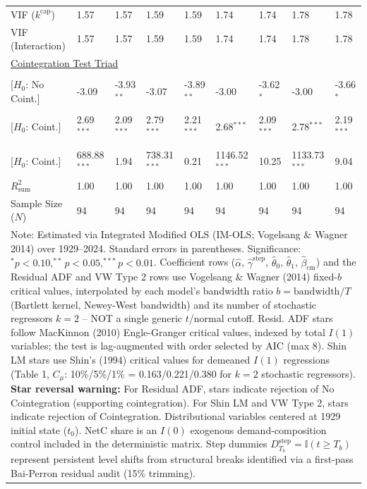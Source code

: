 \begin{table}[H]
\begin{tabular}{p{3.8cm}p{1.35cm}p{1.35cm}p{1.35cm}p{1.35cm}p{1.35cm}p{1.35cm}p{1.35cm}p{1.35cm}}
VIF ($k^{\text{cap}}$) & 1.57 & 1.57 & 1.59 & 1.59 & 1.74 & 1.74 & 1.78 & 1.78  \\
VIF (Interaction) & 1.57 & 1.57 & 1.59 & 1.59 & 1.74 & 1.74 & 1.78 & 1.78  \\
\midrule
\multicolumn{9}{l}{\underline{Cointegration Test Triad}} \\
\makecell[l]{Resid. ADF ($t_{\text{ADF}}$) \\ {\scriptsize [$H_0$: No Coint.]}} & -3.09 & -3.93$^{**}$ & -3.07 & -3.89$^{**}$ & -3.00 & -3.62$^{*}$ & -3.00 & -3.66$^{*}$  \\
\makecell[l]{Shin LM ($C_{\text{Shin}}$) \\ {\scriptsize [$H_0$: Coint.]}} & 2.69$^{***}$ & 2.09$^{***}$ & 2.79$^{***}$ & 2.21$^{***}$ & 2.68$^{***}$ & 2.09$^{***}$ & 2.78$^{***}$ & 2.19$^{***}$  \\
\makecell[l]{VW Type 2 ($S_{\text{Type 2}}$) \\ {\scriptsize [$H_0$: Coint.]}} & 688.88$^{***}$ & 1.94 & 738.31$^{***}$ & 0.21 & 1146.52$^{***}$ & 10.25 & 1133.73$^{***}$ & 9.04  \\
\midrule
$R^2_{\text{sum}}$ & 1.00 & 1.00 & 1.00 & 1.00 & 1.00 & 1.00 & 1.00 & 1.00  \\
Sample Size ($N$) & 94 & 94 & 94 & 94 & 94 & 94 & 94 & 94  \\
\bottomrule
\multicolumn{9}{p{13.2cm}}{\footnotesize Note: Estimated via Integrated Modified OLS (IM-OLS; Vogelsang \& Wagner 2014) over 1929--2024. Standard errors in parentheses. Significance: $^*p<0.10, ^{**}p<0.05, ^{***}p<0.01$. Coefficient rows ($\hat{\alpha}$, $\hat{\gamma}^{\text{step}}$, $\hat{\theta}_0$, $\hat{\theta}_1$, $\hat{\beta}_{\text{cm}}$) and the Residual ADF and VW Type 2 rows use Vogelsang \& Wagner (2014) fixed-$b$ critical values, interpolated by each model's bandwidth ratio $b=\text{bandwidth}/T$ (Bartlett kernel, Newey-West bandwidth) and its number of stochastic regressors $k=2$ -- NOT a single generic $t$/normal cutoff. Resid. ADF stars follow MacKinnon (2010) Engle-Granger critical values, indexed by total $I(1)$ variables; the test is lag-augmented with order selected by AIC (max 8). Shin LM stars use Shin's (1994) critical values for demeaned $I(1)$ regressions (Table 1, $C_\mu$: 10\%/5\%/1\% = 0.163/0.221/0.380 for $k=2$ stochastic regressors). \textbf{Star reversal warning:} For Residual ADF, stars indicate rejection of No Cointegration (supporting cointegration). For Shin LM and VW Type 2, stars indicate rejection of Cointegration. Distributional variables centered at 1929 initial state ($t_0$). NetC share is an $I(0)$ exogenous demand-composition control included in the deterministic matrix. Step dummies $D^{\text{step}}_{T_b} = \mathbb{I}(t \ge T_b)$ represent persistent level shifts from structural breaks identified via a first-pass Bai-Perron residual audit (15\% trimming).}
\end{tabular}
\end{table}
